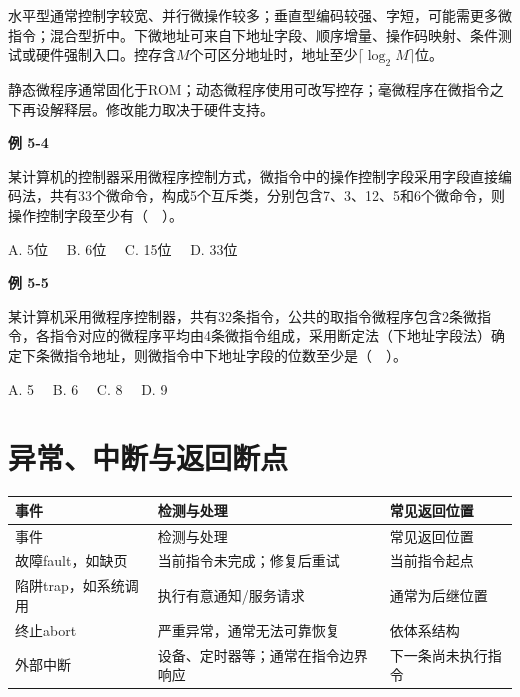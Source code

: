 水平型通常控制字较宽、并行微操作较多；垂直型编码较强、字短，可能需更多微指令；混合型折中。下微地址可来自下地址字段、顺序增量、操作码映射、条件测试或硬件强制入口。控存含\(M\)个可区分地址时，地址至少\(\lceil\log_2M\rceil\)位。

静态微程序通常固化于ROM；动态微程序使用可改写控存；毫微程序在微指令之下再设解释层。修改能力取决于硬件支持。

\par\medskip{}\noindent\hypertarget{CO05-E04}{}\label{CO05-E04}\textbf{例 5-4}\par\nobreak\smallskip

某计算机的控制器采用微程序控制方式，微指令中的操作控制字段采用字段直接编码法，共有33个微命令，构成5个互斥类，分别包含7、3、12、5和6个微命令，则操作控制字段至少有（　）。

A. 5位　 B. 6位　 C. 15位　 D. 33位

\par\medskip{}\noindent\hypertarget{CO05-E05}{}\label{CO05-E05}\textbf{例 5-5}\par\nobreak\smallskip

某计算机采用微程序控制器，共有32条指令，公共的取指令微程序包含2条微指令，各指令对应的微程序平均由4条微指令组成，采用断定法（下地址字段法）确定下条微指令地址，则微指令中下地址字段的位数至少是（　）。

A. 5　 B. 6　 C. 8　 D. 9

\section{异常、中断与返回断点}\label{CO05-events}

\par\smallskip
{\fontsize{9.3}{12}\selectfont\setlength{\tabcolsep}{2.5pt}\setlength{\LTleft}{0pt}\setlength{\LTright}{0pt}
\begin{longtable}{@{}>{\raggedright\arraybackslash}p{}>{\raggedright\arraybackslash}p{}>{\raggedright\arraybackslash}p{}@{}}
\toprule
事件 & 检测与处理 & 常见返回位置 \\

\midrule\endfirsthead\toprule
事件 & 检测与处理 & 常见返回位置 \\

\midrule\endhead\bottomrule\endfoot
故障fault，如缺页 & 当前指令未完成；修复后重试 & 当前指令起点 \\

陷阱trap，如系统调用 & 执行有意通知/服务请求 & 通常为后继位置 \\

终止abort & 严重异常，通常无法可靠恢复 & 依体系结构 \\

外部中断 & 设备、定时器等；通常在指令边界响应 & 下一条尚未执行指令 \\

\end{longtable}}
\par\smallskip

